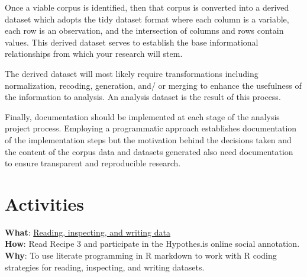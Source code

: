 \documentclass[
  letterpaper,
]{latex/krantz}
\begin{document}
Once a viable corpus is identified, then that corpus is converted into a
derived dataset which adopts the tidy dataset format where each column
is a variable, each row is an observation, and the intersection of
columns and rows contain values. This derived dataset serves to
establish the base informational relationships from which your research
will stem.

The derived dataset will most likely require transformations including
normalization, recoding, generation, and/ or merging to enhance the
usefulness of the information to analysis. An analysis dataset is the
result of this process.

Finally, documentation should be implemented at each stage of the
analysis project process. Employing a programmatic approach establishes
documentation of the implementation steps but the motivation behind the
decisions taken and the content of the corpus data and datasets
generated also need documentation to ensure transparent and reproducible
research.

\hypertarget{activities-1}{%
\section*{Activities}\label{activities-1}}


\begin{tcolorbox}[enhanced jigsaw, toprule=.15mm, bottomtitle=1mm, coltitle=black, title=\textcolor{quarto-callout-tip-color}{\faLightbulb}\hspace{0.5em}{Recipe}, left=2mm, colframe=quarto-callout-tip-color-frame, bottomrule=.15mm, colbacktitle=quarto-callout-tip-color!10!white, leftrule=.75mm, colback=white, titlerule=0mm, breakable, toptitle=1mm, opacityback=0, arc=.35mm, rightrule=.15mm, opacitybacktitle=0.6]

\textbf{What}:
\href{https://lin380.github.io/tadr/articles/recipe_3.html}{Reading,
inspecting, and writing data}\\
\textbf{How}: Read Recipe 3 and participate in the Hypothes.is online
social annotation.\\
\textbf{Why}: To use literate programming in R markdown to work with R
coding strategies for reading, inspecting, and writing datasets.

\end{tcolorbox}
\end{document}
